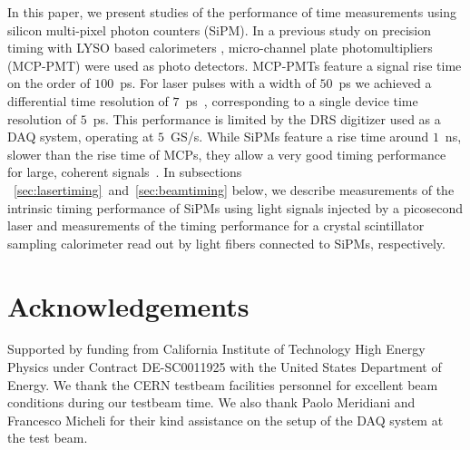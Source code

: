 \documentclass[preprint,1p]{elsarticle}
\begin{document}
In this paper, we present studies of the
performance of time measurements using silicon multi-pixel photon counters
(SiPM). In a previous study on precision timing with LYSO based calorimeters
\cite{lysotiming}, micro-channel plate photomultipliers (MCP-PMT) were used as
photo detectors. MCP-PMTs feature a signal rise time on the order of $100$~ps.
For laser pulses with a width of $50$~ps we achieved a differential time
resolution of $7$~ps~\cite{elba2015}, corresponding to a single device time
resolution of $5$~ps. This performance is limited by the DRS digitizer used as a
DAQ system, operating at $5$~GS/s. While SiPMs feature a rise time around
$1$~ns, slower than the rise time of MCPs, they allow a very good timing
performance for large, coherent signals~\cite{aashrita}. In subsections
~\ref{sec:lasertiming}~and~\ref{sec:beamtiming} below, we describe measurements
of the intrinsic timing performance of SiPMs using light signals injected by a 
picosecond laser and measurements of the timing performance for a crystal 
scintillator sampling calorimeter read out by light fibers connected to SiPMs, 
respectively. 

  
%
%
  
%
%
  
%
%

\section{Acknowledgements} 
Supported by funding from California Institute of Technology High Energy Physics
under Contract DE-SC0011925 with the United States Department of Energy. We
thank the CERN testbeam facilities personnel for excellent beam conditions 
during our testbeam time. We also thank Paolo Meridiani and Francesco Micheli
for their kind assistance on the setup of the DAQ system at the test beam.
%
%


{}
 
\end{document}
